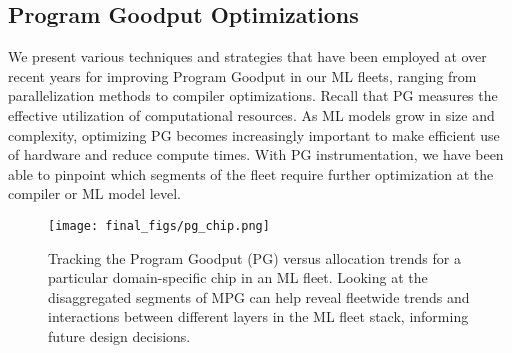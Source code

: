\renewcommand*{\arraystretch}{1.25}
\begin{table*}[h!]
\caption{Optimizing different components of \mpg.}
\label{tab:improvements}
\end{table*}

\subsection{Program Goodput Optimizations}
We present various techniques and strategies that have been employed at \google over recent years for improving Program Goodput in our ML fleets, ranging from parallelization methods to compiler optimizations. Recall that PG measures the effective utilization of computational resources. As ML models grow in size and complexity, optimizing PG becomes increasingly important to make efficient use of hardware and reduce compute times. With PG instrumentation, we have been able to pinpoint which segments of the fleet require further optimization at the compiler or ML model level. 

 \begin{figure}[t]
    \centering
    \texttt{[image: final\_figs/pg\_chip.png]}
    \caption{Tracking the Program Goodput (PG) versus allocation trends for a particular domain-specific chip in an ML fleet. Looking at the disaggregated segments of MPG can help reveal fleetwide trends and interactions between different layers in the ML fleet stack, informing future design decisions.}
    \label{fig:pg_chip_type}
\end{figure}


